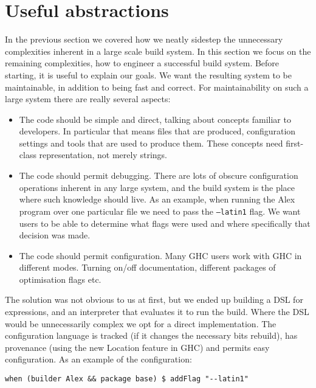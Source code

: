 \section{Useful abstractions\label{section-abstractions}}

In the previous section we covered how we neatly sidestep the unnecessary complexities inherent in a large scale build system. In this section we focus on the remaining complexities, how to engineer a successful build system. Before starting, it is useful to explain our goals. We want the resulting system to be maintainable, in addition to being fast and correct. For maintainability on such a large system there are really several aspects:

\begin{itemize}
\item The code should be simple and direct, talking about concepts familiar to developers. In particular that means files that are produced, configuration settings and tools that are used to produce them. These concepts need first-class representation, not merely strings.
\item The code should permit debugging. There are lots of obscure configuration operations inherent in any large system, and the build system is the place where such knowledge should live. As an example, when running the Alex program over one particular file we need to pass the \texttt{--latin1} flag. We want users to be able to determine what flags were used and where specifically that decision was made.
\item The code should permit configuration. Many GHC users work with GHC in different modes. Turning on/off documentation, different packages of optimisation flags etc.
\end{itemize}

The solution was not obvious to us at first, but we ended up building a DSL for expressions, and an interpreter that evaluates it to run the build. Where the DSL would be unnecessarily complex we opt for a direct implementation. The configuration language is tracked (if it changes the necessary bits rebuild), has provenance (using the new Location feature in GHC) and permits easy configuration. As an example of the configuration:

\begin{verbatim}
when (builder Alex && package base) $ addFlag "--latin1"
\end{verbatim}





